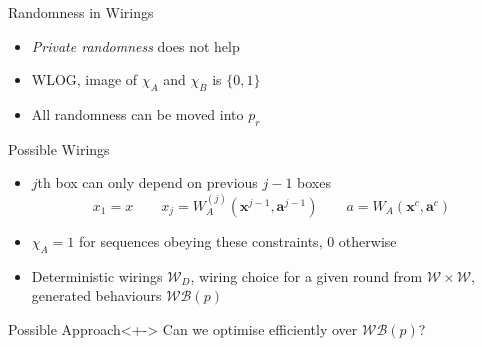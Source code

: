\documentclass[xcolor=dvipsnames]{beamer}
\newcommand{\?}{\mathrel{?}} %
\newcommand{\cvec}[1]{\boldsymbol{\mathbf{#1}}}    %
\newcommand{\sW}{\mathcal{W}}
\newcommand{\sWB}{\mathcal{WB}}
\begin{document}
\begin{frame}{Randomness in Wirings}
  \begin{itemize}[<+->]
    \item \emph{Private randomness} does not help
    \item WLOG, image of \(\chi_A\) and \(\chi_B\) is \(\{0,1\}\)
    \item All randomness can be moved into \(p_r\)
  \end{itemize}
\end{frame}

\begin{frame}{Possible Wirings}
  \begin{itemize}[<+->]
    \item \(j\)th box can only depend on previous \(j-1\) boxes
    \[ x_1 = x \qquad x_j = W^{(j)}_A(\cvec{x}^{j-1}, \cvec{a}^{j-1}) \qquad
      a = W_A(\cvec{x}^{c}, \cvec{a}^{c}) \]
    \item \(\chi_A = 1\) for sequences obeying these constraints, \(0\) otherwise
    \item Deterministic wirings \(\sW_D\), wiring choice for a given round from \(\sW \times \sW\), generated behaviours \(\sWB(p)\)
  \end{itemize}

  \begin{block}{Possible Approach}<+->
    Can we optimise efficiently over \(\sWB(p)\)?
  \end{block}
\end{frame}
\end{document}
